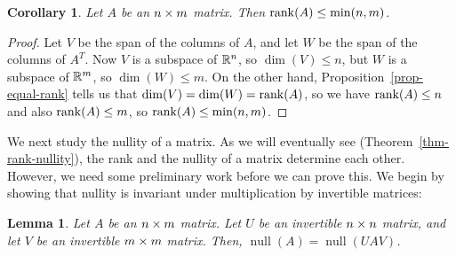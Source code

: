 \documentclass[reqno]{amsart}
\newtheorem{lemma}[theorem]{Lemma}
\newtheorem{corollary}[theorem]{Corollary}
\theoremstyle{definition}
\newcommand{\nullity}{\operatorname{null}}
\begin{document}
\begin{corollary}\label{cor-max-rank}
 Let $A$ be an $n\times m$ matrix.  Then $\operatorname{rank}(A)\leq\min(n,m)$.
\end{corollary}
\begin{proof}
 Let $V$ be the span of the columns of $A$, and let $W$ be the span of
 the columns of $A^T$.  Now $V$ is a subspace of ${\mathbb{R}}^n$, so
 $\dim(V)\leq n$, but $W$ is a subspace of ${\mathbb{R}}^m$, so $\dim(W)\leq
 m$.  On the other hand, Proposition~\ref{prop-equal-rank} tells us
 that $\dim(V)=\dim(W)=\operatorname{rank}(A)$, so we have $\operatorname{rank}(A)\leq n$ and also
 $\operatorname{rank}(A)\leq m$, so $\operatorname{rank}(A)\leq\min(n,m)$.
\end{proof}

We next study the nullity of a matrix. As we will eventually see
(Theorem~\ref{thm-rank-nullity}), the rank and the nullity
of a matrix determine each other. However, we need some preliminary
work before we can prove this.
We begin by showing that nullity is invariant under multiplication
by invertible matrices:

\begin{lemma}\label{lem-nullity-invar}
 Let $A$ be an $n\times m$ matrix.
 Let $U$ be an invertible $n\times n$ matrix,
 and let $V$ be an invertible $m\times m$ matrix.
 Then, $\nullity(A) = \nullity(UAV)$.
\end{lemma}
\end{document}
